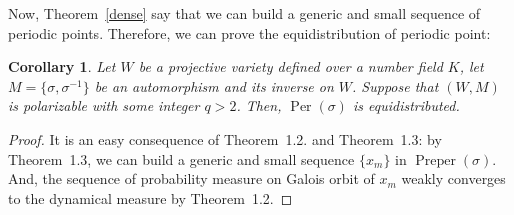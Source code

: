 \documentclass[11pt,letterpaper]{amsart}
\newtheorem{cor}[thm]{Corollary}
\begin{document}
    Now, Theorem~\ref{dense} say that we can build a generic and small sequence of periodic points. Therefore, we can prove the equidistribution of periodic point:

    \begin{cor}
        Let $W$ be a projective variety defined over a number field $K$, let $M = \{\sigma, \sigma^{-1}\}$ be an automorphism and its inverse on $W$. Suppose that $(W,M)$ is polarizable with some integer $q>2$. Then, ${\operatorname{Per}}(\sigma)$ is equidistributed.
    \end{cor}
    \begin{proof}
           It is an easy consequence of Theorem~1.2. and Theorem~1.3: by Theorem~1.3, we can build a generic and small sequence $\{x_m\}$ in ${\operatorname{Preper}}(\sigma)$. And, the sequence of probability measure on Galois orbit of $x_m$ weakly converges to the dynamical measure by Theorem~1.2.
    \end{proof}
\end{document}
